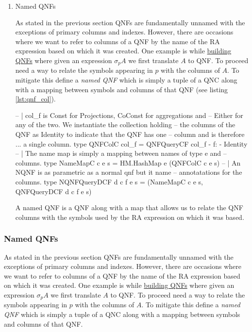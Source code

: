 \begin{enumerate}
\item Named QNFs
  \label{sec:orge07cacb}

  As stated in the previous section QNFs are fundamentally unnamed with
  the exceptions of primary columns and indexes. However, there are
  occasions where we want to refer to columns of a QNF by the name of
  the RA expression based on which it was created. One example is while
  \hyperref[sec:org3f1036f]{building QNFs} where given an expression \(\sigma_p A\) we first
  translate \(A\) to QNF. To proceed need a way to relate the symbols
  appearing in \(p\) with the columns of \(A\). To mitigate this define
  a \emph{named QNF} which is simply a tuple of a QNC along with a mapping
  between symbols and columns of that QNF (see listing \ref{lst:qnf_col}).

  \begin{code}
    \begin{haskellcode}
      -- | col_f is Const for Projections, CoConst for aggregations and
      -- Either for any of the two. We instantiate the collection holding
      -- the columns of the QNF as Identity to indicate that the QNF has one
      -- column and is therefore ... a single column.
      type QNFColC col_f = QNFQueryCF col_f {- f: -} Identity
      -- | The name map is simply a mapping between names of type e and
      -- columns.
      type NameMapC c e s = HM.HashMap e (QNFColC c e s)
      -- | An NQNF is as parametric as a normal qnf but it name
      -- annotatations for the columns.
      type NQNFQueryDCF d c f e s = (NameMapC c e s, QNFQueryDCF d c f e s)
    \end{haskellcode}
    \caption{\label{lst:qnf_col}A named QNF is a QNF along with a map
      that allows us to relate the QNF columns with the symbols used
      by the RA expression on which it was based.}
  \end{code}
\end{enumerate}


\subsubsection{Named QNFs}

As stated in the previous section QNFs are fundamentally unnamed with
the exceptions of primary columns and indexes. However, there are
occasions where we want to refer to columns of a QNF by the name of
the RA expression based on which it was created. One example is while
\hyperref[sec:org3f1036f]{building QNFs} where given an expression
\(\sigma_p A\) we first translate \(A\) to QNF. To proceed need a way
to relate the symbols appearing in \(p\) with the columns of \(A\). To
mitigate this define a \emph{named QNF} which is simply a tuple of a
QNC along with a mapping between symbols and columns of that QNF.

